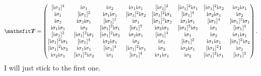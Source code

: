 \documentclass[11pt, english, fleqn, DIV=15, headinclude, BCOR=1cm]{scrartcl}
\begin{document}
\[
    \tens T =
    \begin{pmatrix}
         [\iup\1]^4   &  \iup\1 &  \iup\2 &  \iup\1\iup\1 & [\iup\1]^2   & [\iup\1]^2\iup\1 & [\iup\1]^2\iup\2 & \iup\2\iup\1 \\
         \iup\1 & [\iup\1]^2   &  \iup\1\iup\1 & [\iup\1]^2\iup\2 & [\iup\1]^2\iup\1 &  [\iup\1]^4   & \iup\2\iup\1 &  \iup\2 \\
         \iup\2 & \iup\2\iup\1 & [\iup\1]^2   &  \iup\1 & [\iup\1]^2\iup\2 &  \iup\1\iup\1 &  [\iup\1]^4   & [\iup\1]^2\iup\1 \\
         \iup\1\iup\1 &  \iup\2 & [\iup\1]^2\iup\1 & [\iup\1]^2   & \iup\2\iup\1 & [\iup\1]^2\iup\2 &  \iup\1 &  [\iup\1]^4   \\
        [\iup\1]^2   & [\iup\1]^2\iup\1 & [\iup\1]^2\iup\2 & \iup\2\iup\1 &  [\iup\1]^4   &  \iup\1 &  \iup\2 &  \iup\1\iup\1 \\
        [\iup\1]^2\iup\1 &  [\iup\1]^4   & \iup\2\iup\1 &  \iup\2 &  \iup\1 & [\iup\1]^2   &  \iup\1\iup\1 & [\iup\1]^2\iup\2 \\
        [\iup\1]^2\iup\2 &  \iup\1\iup\1 &  [\iup\1]^4   & [\iup\1]^2\iup\1 &  \iup\2 & \iup\2\iup\1 & [\iup\1]^21   &  \iup\1 \\
        \iup\2\iup\1 & [\iup\1]^2\iup\2 &  \iup\1 &  [\iup\1]^4   &  \iup\1\iup\1 &  \iup\2 & [\iup\1]^2\iup\1 & [\iup\1]^2  
    \end{pmatrix}.
\]
I will just stick to the first one.
\end{document}
